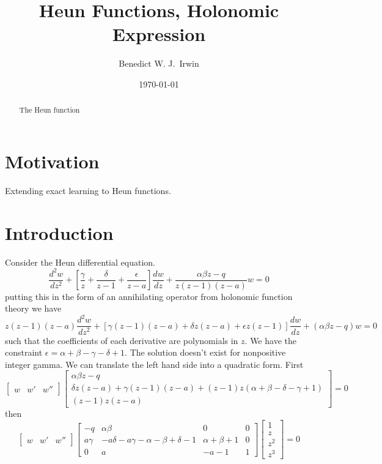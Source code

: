 \documentclass{article}
\title{Heun Functions, Holonomic Expression}
\date{\today}
\begin{document}
\author[1,2]{Benedict W. J.~Irwin}

\maketitle

\begin{abstract}
The Heun function
\end{abstract}


\section{Motivation}
Extending exact learning to Heun functions.

\section{Introduction}
Consider the Heun differential equation.
$$
\frac{d^2w}{dz^2}+ 
\left[\frac{\gamma}{z}+ \frac{\delta}{z-1} + \frac{\epsilon}{z-a} \right] 
\frac {dw}{dz} 
+ \frac {\alpha \beta z -q} {z(z-1)(z-a)} w = 0
$$
putting this in the form of an annihilating operator from holonomic function theory we have
$$
z(z-1)(z-a)\frac{d^2w}{dz^2}+ 
\left[\gamma (z-1)(z-a)+ \delta z (z-a) + \epsilon z(z-1) \right] 
\frac {dw}{dz} 
+ (\alpha \beta z -q) w = 0
$$
such that the coefficients of each derivative are polynomials in $z$. We have the constraint $\epsilon = \alpha + \beta - \gamma - \delta + 1$. The solution doesn't exist for nonpositive integer gamma.
We can translate the left hand side into a quadratic form. First
$$
\begin{bmatrix}
w & w' & w''
\end{bmatrix}
\begin{bmatrix}
\alpha  \beta  z-q \\
\delta  z (z-a)+\gamma  (z-1) (z-a)+(z-1) z (\alpha +\beta -\delta -\gamma +1) \\
(z-1) z (z-a)
\end{bmatrix}
=0
$$
then
$$
\begin{bmatrix}
w & w' & w''
\end{bmatrix}
\begin{bmatrix}
-q & \alpha \beta & 0 & 0\\
a \gamma & -a \delta -a \gamma -\alpha -\beta +\delta -1 & \alpha +\beta +1 & 0 \\
0 & a & -a -1 & 1
\end{bmatrix}
\begin{bmatrix}
1 \\ z \\ z^2 \\ z^3
\end{bmatrix}
= 0
$$
\end{document}
